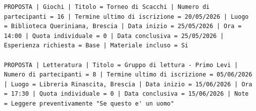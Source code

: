 \documentclass[12pt,a4paper,oneside]{report}
\begin{document}
\begin{lstlisting}[style=batch, caption={setup\_completo.batch}, captionpos=b]
PROPOSTA | Giochi | Titolo = Torneo di Scacchi | Numero di partecipanti = 16 | Termine ultimo di iscrizione = 20/05/2026 | Luogo = Biblioteca Queriniana, Brescia | Data inizio = 25/05/2026 | Ora = 14:00 | Quota individuale = 0 | Data conclusiva = 25/05/2026 | Esperienza richiesta = Base | Materiale incluso = Si

PROPOSTA | Letteratura | Titolo = Gruppo di lettura - Primo Levi | Numero di partecipanti = 8 | Termine ultimo di iscrizione = 05/06/2026 | Luogo = Libreria Rinascita, Brescia | Data inizio = 15/06/2026 | Ora = 17:30 | Quota individuale = 0 | Data conclusiva = 15/06/2026 | Note = Leggere preventivamente "Se questo e' un uomo"
\end{lstlisting}

\end{document}
